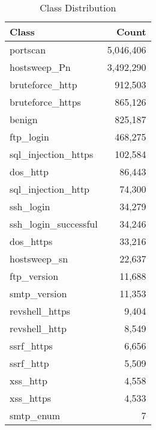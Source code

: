 \begin{table}[tp]
\centering
\caption{Class Distribution}
\label{tab:class_distribution}
\begin{tabular}{|l|r|}
\hline
\textbf{Class}        & \textbf{Count}   \\ \hline
portscan                    & 5,046,406        \\ \hline
hostsweep\_Pn               & 3,492,290        \\ \hline
bruteforce\_http            & 912,503          \\ \hline
bruteforce\_https           & 865,126          \\ \hline
benign                      & 825,187          \\ \hline
ftp\_login                  & 468,275          \\ \hline
sql\_injection\_https       & 102,584          \\ \hline
dos\_http                   & 86,443           \\ \hline
sql\_injection\_http        & 74,300           \\ \hline
ssh\_login                  & 34,279           \\ \hline
ssh\_login\_successful      & 34,246           \\ \hline
dos\_https                  & 33,216           \\ \hline
hostsweep\_sn               & 22,637           \\ \hline
ftp\_version                & 11,688           \\ \hline
smtp\_version               & 11,353           \\ \hline
revshell\_https             & 9,404            \\ \hline
revshell\_http              & 8,549            \\ \hline
ssrf\_https                 & 6,656            \\ \hline
ssrf\_http                  & 5,509            \\ \hline
xss\_http                   & 4,558            \\ \hline
xss\_https                  & 4,533            \\ \hline
smtp\_enum                  & 7                \\ \hline
\end{tabular}%
\end{table}


